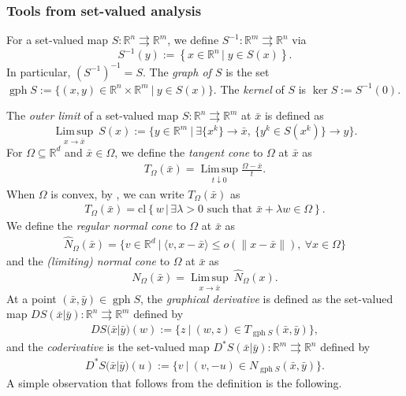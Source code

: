 \documentclass[reqno]{amsart}
\numberwithin{equation}{section}
\newcommand{\R}{\mathbb{R}}
\newcommand{\x}{\bar{x}}
\newcommand{\st}{\text{ such that }}
\newcommand{\gph}{\operatorname{gph}}
\newcommand{\set}[2]{\left\{#1\,\left\vert\; #2\right.\right\}}
\newcommand{\Limsup}{\operatorname{Lim \, sup}}
\begin{document}
\subsubsection{Tools from set-valued analysis} For a set-valued map $S : \R^{n} \rightrightarrows \R^{m}$,  we define $S^{-1}:\R^m\rightrightarrows \R^n$ via 
\[
S^{-1}(y):=\set{x\in \R^n}{y\in S(x)}.
\]
In particular, $(S^{-1})^{-1}=S$. 
The \emph{graph of $S$} is the set $\gph S := \{(x, y) \in \R^{n} \times \R^{m} \ | \ y \in S(x)\}$.   The \emph{kernel} of $S$ is $\ker S := S^{-1}(0)$.

 The \emph{outer limit} of a set-valued map 
$S : \R^{n} \rightrightarrows \R^{m}$ at $\x$ is defined as 
  \[
  \underset{x \to \x}{\Limsup} \ S(x) := \{y \in \R^{m} \ | \ \exists \{x^k\} \to \x, \ \{y^k \in S(x^k)\} \to y \}.
 \]
For $\Omega \subseteq \R^d$ and $\bar{x} \in \Omega$, we define the \emph{tangent cone} to $\Omega$ at $\x$ as 
\begin{align*}
    T_\Omega(\bar{x}) = \underset{t \downarrow 0}{\Limsup} \frac{\Omega - \bar{x}}{t}.
\end{align*} 
When $\Omega$ is convex, by \cite[Theorem 6.9]{RoW 98}, we can write $T_\Omega(\x)$ as
\begin{align*}
    T_\Omega(\bar x) = \mathrm{cl} \left \{ w \, \big| \, \exists \lambda > 0 \st \bar x + \lambda w \in \Omega \right\}.
\end{align*}
We define the \emph{regular normal cone} to $\Omega$ at $\x$ as
\begin{align*}
    \hat{N}_\Omega(\x) = \{v \in \R^d \ | \ \langle v, x - \x \rangle \le o(\lVert x - \x \rVert), \ \forall x \in \Omega\}
\end{align*} and the \emph{(limiting) normal cone} to $\Omega$ at $\x$ as
\[
N_\Omega(\bar x) = \underset{x \to \x}{\Limsup} \ \hat{N}_\Omega(x).
\]
At a point $(\bar{x}, \bar{y}) \in \gph S$, the \emph{graphical derivative} is defined as the  set-valued map $DS(\bar{x}|\bar{y}) : \R^{n} \rightrightarrows \R^{m}$
defined by 
\begin{align*}
    DS(\bar{x}|\bar{y})(w) := \{z \ | \ (w, z) \in T_{\gph S}(\bar{x}, \bar{y})\},
\end{align*} and the \emph{coderivative} is the set-valued map $D^*S(\bar{x}|\bar{y}) : \R^{m} \rightrightarrows \R^{n}$ defined by
\begin{align*}
D^*S(\bar{x}|\bar{y})(u) := \{v \ | \ (v, -u) \in N_{\gph S}(\bar{x}, \bar{y})\}.
\end{align*}
A simple observation that follows from the definition is the following.
\end{document}
